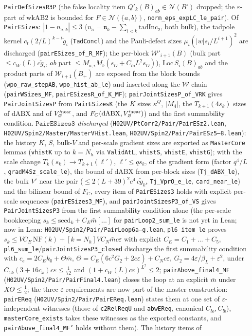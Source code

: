 \documentclass[11pt]{amsart}
\theoremstyle{definition}
\theoremstyle{remark}
\numberwithin{equation}{section}
\begin{document}
\texttt{PairDefSizesR3P} (the false locality item $Q'_k(B)_{ab}\in\mathcal N(B^\square)$ dropped; the $\varepsilon$-part of $\mathrm{wkAB2}$ is bounded for $F\in\mathcal N(\{a,b\})$, \texttt{norm\_eps\_expLC\_le\_pair}). Of \texttt{PairESizes}: $|1-n_{a,k}|\le3$ ($n_a=\mathfrak n_k-\sum_{i<k}\mathrm{tadInc}_2$, both bulk), the tadpole kernel $c_t(2/L)^{k-i}\check g_i$ (\texttt{TadConcl}) and the Pauli-defect sizes $\mu_i(|w|s_i/L^{i+1})^2$ are discharged (\texttt{pairESizes\_of\_R\_MF}); the per-block $\mathcal W'_{i+1}(B)$ (bulk part $\le c_W(L)c\check g_i$, $ab$ part $\le M_{a,i}M_b(s_O+C_{lo}L^2s_O)$), $\mathrm{Loc}\,S_i(B)_{ab}$ and the product parts of $\mathcal W_{i+1}(B_+)$ are exposed from the block bounds (\texttt{wpo\_raw\_stepAB}, \texttt{wpo\_hist\_ab\_le}) and inserted along the $\mathcal W$ chain (\texttt{pairWSizes\_MF}, \texttt{pairESizesR\_of\_K\_MF}); \texttt{pairJointSizesP\_of\_VRK} gives \texttt{PairJointSizesP} from \texttt{PairESizesK} (the $K$ sizes $\kappa^Q$, $|M_4|$, the $T_{k+1}(4s_k)$ sizes of $\mathrm{dABX}$ and of $V'^{\rm near}_\varnothing$, and $F_C(\mathrm{dABX},V'^{\rm near}_\varnothing)$) and the first summability condition. \emph{$\texttt{PairESizes3}$ discharged} (\texttt{H02UV/PtCorr2/Pair/PairESz2.lean}, \texttt{H02UV/Spin2/Master/MasterVHist.lean}, \texttt{H02UV/Spin2/Pair/PairESz5--8.lean}): the history $K$, $S$, bulk-$V$ and per-scale gradient sizes are exported as \texttt{MasterCore} lemmas (\texttt{vhistK} up to $k=N_h$ via \texttt{ValidAtL}, \texttt{vhistS}, \texttt{vhistE}, \texttt{vhistG}); with the scale change $T_k(s_k)\to T_{k+1}(\ell')$, $\ell'\le qs_k$, of the gradient form (factor $q^4/L$, \texttt{gradM4Sz\_scale\_le}), the bound of $\mathrm{dABX}$ from per-block sizes (\texttt{Tj\_dABX\_le}), the bulk $V'$ near the pair ($\le 2(L+39)^2c^4\,c\check g_k$, \texttt{Tj\_VprO\_e\_le}, \texttt{card\_near\_le}) and the bilinear bound of $F_C$, every item of \texttt{PairESizes3} holds with explicit per-scale sequences (\texttt{pairESizes3\_MF}), and \texttt{pairJointSizesP3\_of\_VS} gives \texttt{PairJointSizesP3} from the first summability condition alone (the per-scale bookkeeping $s_k\le\mathrm{seed}_k+C_E\bar m[\dots]$ for \texttt{pairLoop2\_sum\_le} is not yet in Lean; now in Lean: \texttt{H02UV/Spin2/Pair/PairLoop6a--g.lean}, \texttt{pl6\_item\_le} proves $s_k\le V C_E\,\mathrm{NF}(k)+[k=N_h]VC_N\bar m c\varepsilon$ with explicit $C_E=C_1+\dots+C_5$, \texttt{pl6\_sum\_le}/\texttt{pairJointSizesP3\_closed} discharge the first summability condition with $c_e=2C_Ek_0+\Theta\bar m$, $\Theta=C_E(6c^2G_2+2c\varepsilon)+C_Nc\varepsilon$, $G_2=4\varepsilon/\beta_L+\varepsilon^2$, under $C_{1k}(3+16c_x)c\varepsilon\le\frac1{72}$ and $(1+c_W(L)c\varepsilon)^{L^2}\le2$; \texttt{pairAbove\_final4\_MF} (\texttt{H02UV/Spin2/Pair/PairFinal4.lean}) closes the loop at an explicit $\bar m$ under $X\Theta\le\frac12$; the three $\varepsilon$-requirements are now part of the master construction: \texttt{pairEReq} (\texttt{H02UV/Spin2/Pair/PairEReq.lean}) states them at one set of $\varepsilon$-independent witnesses (those of \texttt{c2RelReqU} and \texttt{abwEReq}, canonical $C_{lo},C_{lb}$), \texttt{masterCore\_exists} takes these witnesses as the exported constants, and \texttt{pairAbove\_final4\_MF'} holds without them). The history items of 
\end{document}
